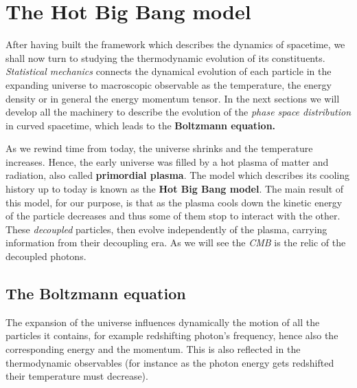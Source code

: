 \chapter{The Hot Big Bang model}\label{chap:HotBigBang}
After having built the framework which describes the dynamics of spacetime, we shall now turn to studying the thermodynamic evolution of its constituents. \emph{Statistical mechanics} connects the dynamical evolution of each particle in the expanding universe to macroscopic observable as the temperature, the energy density or in general the energy momentum tensor. In the next sections we will develop all the machinery to describe the evolution of the \emph{phase space distribution} in curved spacetime, which leads to the \textbf{Boltzmann equation.}

As we rewind time from today, the universe shrinks and the temperature increases. Hence, the early universe was filled by a hot plasma of matter and radiation, also called \textbf{primordial plasma}. The model which describes its cooling history up to today is known as the \textbf{Hot Big Bang model}. The main result of this model, for our purpose, is that as the plasma cools down the kinetic energy of the particle decreases and thus some of them stop to interact with the other. These \emph{decoupled} particles, then evolve independently of the plasma, carrying information from their decoupling era. As we will see the \emph{CMB} is the relic of the decoupled photons. 

\section{The Boltzmann equation}\label{sec:BoltzmannEquation}
The expansion of the universe influences dynamically the motion of all the particles it contains, for example redshifting photon's frequency, hence also the corresponding energy and the momentum. This is also reflected in the thermodynamic observables (for instance as the photon energy gets redshifted their temperature must decrease). 

